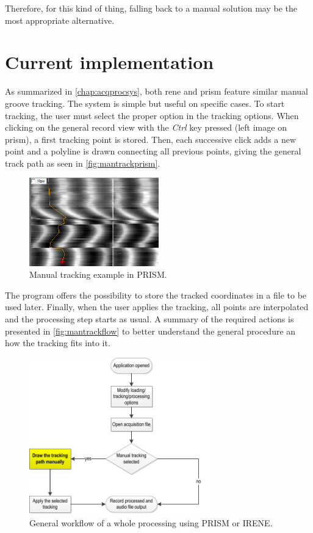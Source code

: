Therefore, for this kind of thing, falling back to a manual solution may be the most appropriate alternative.

\section{Current implementation}
\label{sec:mancurrentimpl}

As summarized in \autoref{chap:acqprocsys}, both \gls{rene} and \gls{prism} feature similar manual groove tracking. The system is simple but useful on specific cases. To start tracking, the user must select the proper option in the tracking options. When clicking on the general record view with the \emph{Ctrl} key pressed (left image on \gls{prism}), a first tracking point is stored. Then, each successive click adds a new point and a polyline is drawn connecting all previous points, giving the general track path as seen in \autoref{fig:mantrackprism}.

\begin{figure}[!ht]
\centering
\includegraphics[width=0.5\textwidth]{images/manual-tracking-prism}
\caption{Manual tracking example in PRISM.}
\label{fig:mantrackprism}
\end{figure}

The program offers the possibility to store the tracked coordinates in a file to be used later. Finally, when the user applies the tracking, all points are interpolated and the processing step starts as usual. A summary of the required actions is presented in \autoref{fig:mantrackflow} to better understand the general procedure an how the tracking fits into it.

\begin{figure}[!ht]
\centering
\includegraphics[width=0.7\textwidth]{images/man-track-flow}
\caption{General workflow of a whole processing using PRISM or IRENE.}
\label{fig:mantrackflow}
\end{figure}

